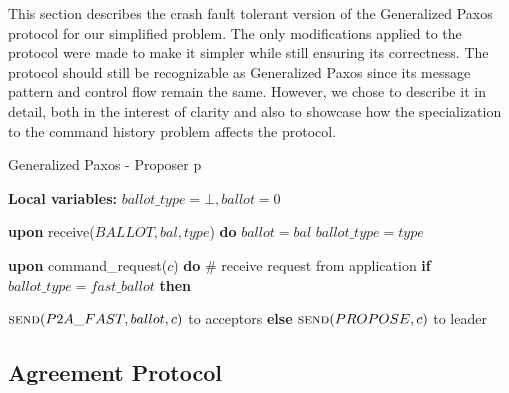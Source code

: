 This section describes the crash fault tolerant version of the Generalized Paxos protocol for our simplified problem. The only modifications applied to the protocol were made to make it simpler while still ensuring its correctness. The protocol should still be recognizable as Generalized Paxos since its message pattern and control flow remain the same. However, we chose to describe it in detail, both in the interest of clarity and also to showcase how the specialization to the command history problem affects the protocol.

\begin{algorithm}[h] 
	\caption{Generalized Paxos - Proposer p}
	\textbf{Local variables:} $ballot\_type = \bot, ballot = 0$
	\begin{algorithmic}[1]
		
		\State \textbf{upon} receive($BALLOT, bal, type$) \textbf{do} 
		\State \hspace{\algorithmicindent} 
		$ballot = bal$
		\State \hspace{\algorithmicindent} 
		$ballot\_type = type$
		\State
		
		\State \textbf{upon} command\_request($c$) \textbf{do}   \hspace{\algorithmicindent}\hspace{\algorithmicindent}\hspace{\algorithmicindent}\# receive request from application
		\State \hspace{\algorithmicindent} \textbf{if} $ballot\_type = fast\_ballot$ \textbf{then}
		
		\State \hspace{\algorithmicindent}\hspace{\algorithmicindent} $\Call{send}{P2A\_FAST, ballot, c}$ to acceptors
		\State \hspace{\algorithmicindent} \textbf{else} 
		\State \hspace{\algorithmicindent}\hspace{\algorithmicindent} $\Call{send}{PROPOSE, c}$ to leader
	\end{algorithmic}
\end{algorithm}

\subsection{Agreement Protocol}

